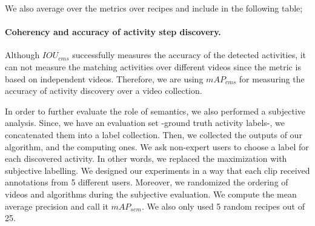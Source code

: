 We also average over the metrics over recipes and include in the following table;
\begin{table}
\caption{Average of $IOU_{cms}$ and $mAP_{cms}$ over recipes.}
{\small
{}}
\normalsize
\end{table}

\paragraph{Coherency and accuracy of activity step discovery.}
Although $IOU_{cms}$ successfully measures the accuracy of the detected activities, it can not measure the matching activities over different videos since the metric is based on independent videos. Therefore, we are using $mAP_{cms}$ for measuring the accuracy of activity discovery over a video collection.

In order to further evaluate the role of semantics, we also performed a subjective analysis. Since, we have an evaluation set -ground truth activity labels-, we concatenated them into a label collection. Then, we collected the outputs of our algorithm, and the computing ones. We ask non-expert users to choose a label for each discovered activity. In other words, we replaced the maximization with subjective labelling. We designed our experiments in a way that each clip received annotations from 5 different users. Moreover, we randomized the ordering of videos and algorithms during the subjective evaluation. We compute the mean average precision and call it $mAP_{sem}$. We also only used 5 random recipes out of 25.

